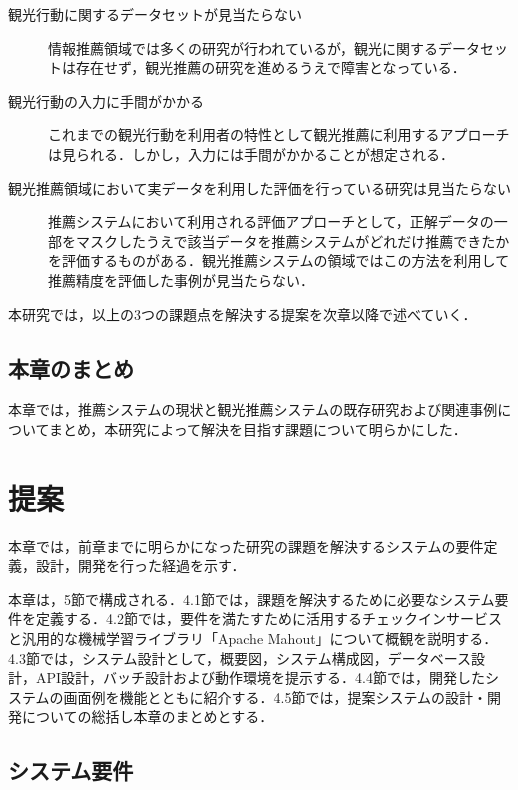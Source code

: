 \documentclass{jsarticle}
\begin{document}
\begin{description}
\item[観光行動に関するデータセットが見当たらない]
       情報推薦領域では多くの研究が行われているが，観光に関するデータセットは存在せず，観光推薦の研究を進めるうえで障害となっている．
\item[観光行動の入力に手間がかかる]
       これまでの観光行動を利用者の特性として観光推薦に利用するアプローチは見られる．しかし，入力には手間がかかることが想定される．
\item[観光推薦領域において実データを利用した評価を行っている研究は見当たらない]
       推薦システムにおいて利用される評価アプローチとして，正解データの一部をマスクしたうえで該当データを推薦システムがどれだけ推薦できたかを評価するものがある．観光推薦システムの領域ではこの方法を利用して推薦精度を評価した事例が見当たらない．
\end{description}

本研究では，以上の3つの課題点を解決する提案を次章以降で述べていく．

\subsection{本章のまとめ}

本章では，推薦システムの現状と観光推薦システムの既存研究および関連事例についてまとめ，本研究によって解決を目指す課題について明らかにした． 

\newpage

\section{提案}

本章では，前章までに明らかになった研究の課題を解決するシステムの要件定義，設計，開発を行った経過を示す．

本章は，5節で構成される．4.1節では，課題を解決するために必要なシステム要件を定義する．4.2節では，要件を満たすために活用するチェックインサービスと汎用的な機械学習ライブラリ「Apache Mahout」について概観を説明する．4.3節では，システム設計として，概要図，システム構成図，データベース設計，API設計，バッチ設計および動作環境を提示する．4.4節では，開発したシステムの画面例を機能とともに紹介する．4.5節では，提案システムの設計・開発についての総括し本章のまとめとする．

\newpage
\subsection{システム要件}
\end{document}
